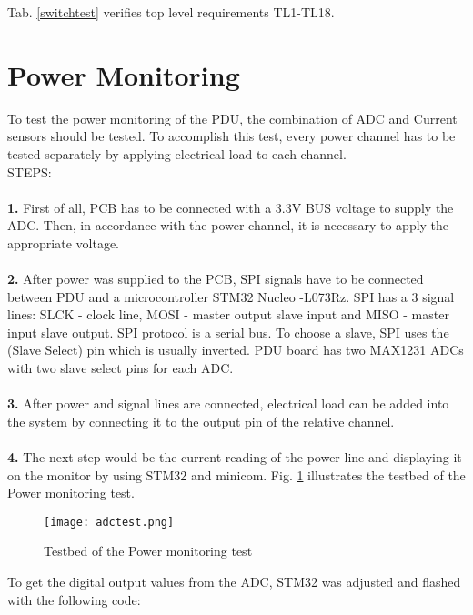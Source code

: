 	Tab. \ref{switchtest} verifies top level requirements TL1-TL18.
	
	
	\section{Power Monitoring}
	
	To test the power monitoring of the PDU, the combination of ADC and Current sensors should be tested. To accomplish this test, every power channel has to be tested separately by applying electrical load to each channel. \\
	\newpage
	STEPS:\\ \\
	\textbf{1.} First of all, PCB has to be connected with a 3.3V BUS voltage to supply the ADC. Then, in accordance with the power channel, it is necessary to apply the appropriate voltage. \\ \\
	\textbf{2.} After power was supplied to the PCB, SPI signals have to be connected between PDU and a microcontroller STM32 Nucleo -L073Rz. SPI has a 3 signal lines: SLCK - clock line, MOSI - master output slave input and MISO - master input slave output. SPI protocol is a serial bus. To choose a slave, SPI uses the (Slave Select) pin which is usually inverted. PDU board has two MAX1231 ADCs with two slave select pins for each ADC.\\ \\
	\textbf{3.} After power and signal lines are connected, electrical load can be added into the system by connecting it to the output pin of the relative channel.\\ \\
	\textbf{4.} The next step would be the current reading of the power line and displaying it on the monitor by using STM32 and minicom.
	  Fig. \ref{fig: adctest} illustrates the testbed of the Power monitoring test.
	\begin{figure}[h]
		\centering
		\texttt{[image: adctest.png]}
		\caption{Testbed of the Power monitoring test}
		\label{fig: adctest}
	\end{figure}
	 \newpage
	 To get the digital output values from the ADC, STM32 was adjusted and flashed with the following code:
	 
